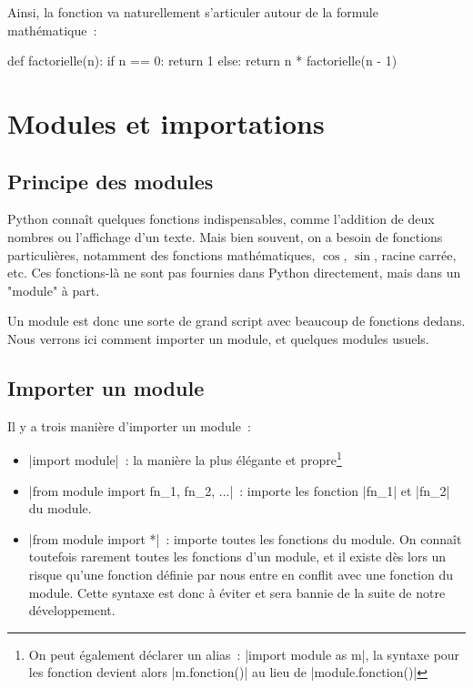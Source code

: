 		Ainsi, la fonction va naturellement s'articuler autour de la formule mathématique~:
		\begin{pythoncode}
			def factorielle(n):
				if n == 0:
					return 1
				else:
					return n * factorielle(n - 1)
		\end{pythoncode}
		
\section{Modules et importations}
	
	\subsection{Principe des modules}
		
		Python connaît quelques fonctions indispensables, comme l'addition de deux nombres ou l'affichage d'un texte. Mais bien souvent,
		on a besoin de fonctions particulières, notamment des fonctions mathématiques, $\cos$, $\sin$, racine carrée, etc.
		Ces fonctions-là ne sont pas fournies dans Python directement, mais dans un "module" à part.
		
		Un module est donc une sorte de grand script avec beaucoup de fonctions dedans. Nous verrons ici comment importer un module, et quelques modules usuels.
	
	\subsection{Importer un module}
		
		Il y a trois manière d'importer un module~:
		\begin{itemize}
			\item \python|import module|~: la manière la plus élégante et propre\footnote{On peut également déclarer un alias~: \python|import module as m|, la syntaxe pour les fonction devient alors \python|m.fonction()| au lieu de \python|module.fonction()|}
			\item \python|from module import fn_1, fn_2, ...|~: importe les fonction \python|fn_1| et \python|fn_2| du module.
			\item \python|from module import *|~: importe toutes les fonctions du module. On connaît toutefois rarement toutes les fonctions d'un module, et il existe dès lors un risque qu'une fonction définie par nous entre en conflit avec une fonction du module. Cette syntaxe est donc à éviter et sera bannie de la suite de notre développement.
		\end{itemize}
		
